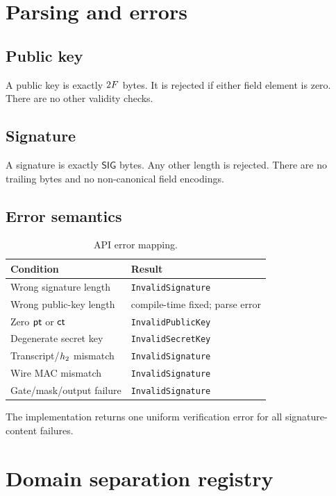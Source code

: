 \documentclass[11pt,a4paper]{article}
\begin{document}
\section{Parsing and errors}

\subsection{Public key}

A public key is exactly $2F$ bytes. It is rejected if either field
element is zero. There are no other validity checks.

\subsection{Signature}

A signature is exactly $\mathsf{SIG}$ bytes. Any other length is rejected.
There are no trailing bytes and no non-canonical field encodings.

\subsection{Error semantics}

\begin{table}[ht]
\centering
\small
\caption{API error mapping.}
\label{tab:errors}
\begin{tabular}{@{}ll@{}}
\toprule
Condition & Result \\
\midrule
Wrong signature length & \texttt{InvalidSignature} \\
Wrong public-key length & compile-time fixed; parse error \\
Zero $\mathsf{pt}$ or $\mathsf{ct}$ & \texttt{InvalidPublicKey} \\
Degenerate secret key & \texttt{InvalidSecretKey} \\
Transcript/$h_2$ mismatch & \texttt{InvalidSignature} \\
Wire MAC mismatch & \texttt{InvalidSignature} \\
Gate/mask/output failure & \texttt{InvalidSignature} \\
\bottomrule
\end{tabular}
\end{table}

The implementation returns one uniform verification error for all
signature-content failures.

\section{Domain separation registry}
\end{document}
